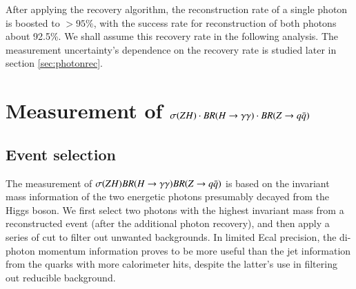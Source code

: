 \documentclass[11pt,a4paper]{cepcnote}
\newcommand{\Zqq}{Z\rightarrow q\bar q}
\newcommand{\PRZH}{\sigma(ZH)}
\newcommand{\qt}{\PRZH\cdot BR(\Hgg)\cdot BR(\Zqq)}
\begin{document}
After applying the recovery algorithm, the reconstruction rate of a single photon is boosted to $>95\%$, with the success rate for reconstruction of both photons about 92.5\%. We shall assume this recovery rate in the following analysis. The measurement uncertainty's dependence on the recovery rate is studied later in section \ref{sec:photonrec}.

\section{Measurement of $\qt$}
\label{sec:measurement}
\subsection{Event selection}
The measurement of $\PRZH BR(\Hgg) BR(\Zqq)$ is based on the invariant mass information of the two energetic photons presumably decayed from the Higgs boson. We first select two photons with the highest invariant mass from a reconstructed event (after the additional photon recovery), and then apply a series of cut to filter out unwanted backgrounds. In limited Ecal precision, the di-photon momentum information proves to be more useful than the jet information from the quarks with more calorimeter hits, despite the latter's use in filtering out reducible background.
\end{document}
